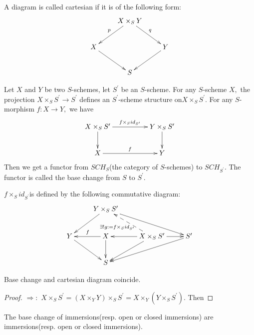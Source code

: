 \begin{Def}
A diagram is called cartesian if it is of the following form:
\[ \xymatrix{
   & {X\times_S Y} \ar"2,1"_p \ar"2,3"^q      \\
   X \ar"3,2" & & Y \ar"3,2"                  \\
   & S } \]
\end{Def}
\begin{Def}
Let $X$ and $Y$ be two $S$-schemes, let $S^{\prime}$ be an
$S$-scheme. For any $S$-scheme $X,$ the projection $X\times_S
S^{\prime} \rightarrow S^{\prime}$ defines an $S^{\prime}$-scheme
structure on$X\times_S S^{\prime}.$ For any $S$-morphism $f:
X\rightarrow Y,$ we have
\[ \xymatrix@C=5em{
   {X\times_S S^{\prime}} \ar[d] \ar[r]^{f\times_S id_{S^{\prime}}} &
   {Y\times_S S^{\prime}} \ar[d]                                    \\
   X \ar[r]^f &Y } \]
Then we get a functor from $SCH_S$(the category of $S$-schemes) to
$SCH_{S^{\prime}}.$ The functor is called the base change from $S$
to $S^{\prime}.$
\end{Def}
\begin{remark}
$f\times_S id_{S^{\prime}}$is defined by the following commutative
diagram:
\[ \xymatrix{
   & {Y\times_S S^{\prime}} \ar"2,1" \ar"2,4"                  \\
   Y \ar"3,2" & X \ar[l]_f \ar"3,2"
   & {X\times_S S^{\prime}} \ar[l] \ar[r] \ar@{-->}"1,2"^{\exists !g:=f\times_S id_{S^{\prime}}}
   \ar"3,2" & S^{\prime} \ar"3,2"                                               \\
   & S  }   \]
\end{remark}
\begin{prop}
Base change and cartesian diagram coincide.
\end{prop}
\begin{proof}
$\Longrightarrow:$ $X\times_S S^{\prime}=(X\times_Y Y)\times_S
S^{\prime}=X\times_Y (Y\times_S S^{\prime}).$ Then
\end{proof}
\begin{prop}
The base change of immersions(resp. open or closed immersions) are
immersions(resp. open or closed immersions).
\end{prop}
